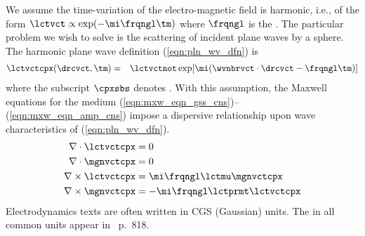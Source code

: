 \documentclass[12pt]{article}
\begin{document}
We assume the time-variation of the electro-magnetic field is
harmonic, i.e., of the form 
$\lctvct \propto \exp(-\mi \frqngl \tm)$ 
where $\frqngl$ is the .
The particular problem we wish to solve is the scattering of incident
plane waves by a sphere.
The harmonic plane wave definition (\ref{eqn:pln_wv_dfn}) is
\begin{eqnarray}
\lctvctcpx(\drcvct,\tm) 
& = & 
\lctvctnot \exp[\mi (\wvnbrvct \cdot \drcvct - \frqngl \tm ) ] \nonumber \\
\label{eqn:pln_wv_gnr_dfn}
\end{eqnarray}
where the subscript $\cpxsbs$ denotes .
With this assumption, the Maxwell equations for the medium 
(\ref{eqn:mxw_eqn_gss_cns})--(\ref{eqn:mxw_eqn_amp_cns}) impose
a dispersive relationship upon wave characteristics of
(\ref{eqn:pln_wv_dfn}). 
\begin{subequations}
\label{eqn:mxw_dsp}
\begin{align}
\label{eqn:mxw_dsp_gss}
\nabla \cdot \lctvctcpx & = 0 \\
\label{eqn:mxw_dsp_mgn}
\nabla \cdot \mgnvctcpx & = 0 \\
\label{eqn:mxw_dsp_frd}
\nabla \times \lctvctcpx & = \mi \frqngl \lctmu \mgnvctcpx \\
\label{eqn:mxw_dsp_amp}
\nabla \times \mgnvctcpx & = - \mi \frqngl \lctprmt \lctvctcpx
\end{align}
\end{subequations} 
Electrodynamics texts are often written in CGS (Gaussian) units. 
The  in all common units appear in
\cite{Jac75}~p.~818.
\end{document}
